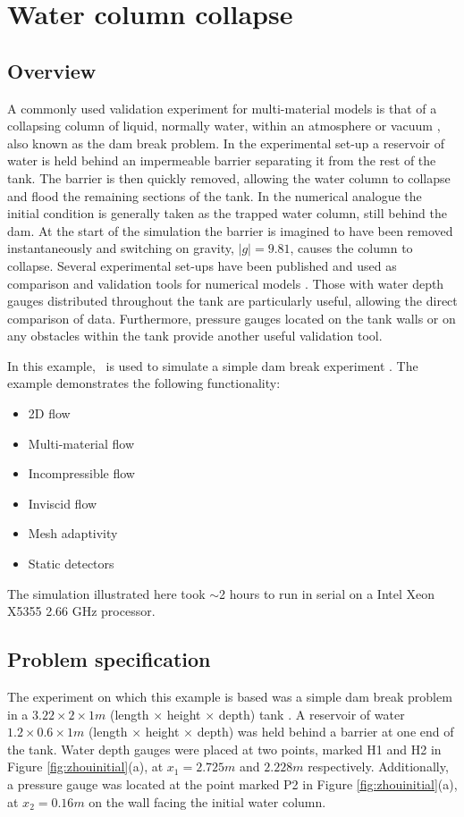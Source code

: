 \section{Water column collapse}
\label{sect:water_collapse}

\subsection{Overview}
A commonly used validation experiment for multi-material models is that of a collapsing column of liquid, normally water, within an atmosphere or vacuum \citep{lakehal_interface_2002}, also known as the dam break problem.  In the experimental set-up a reservoir of water is held behind an impermeable barrier separating it from the rest of the tank.  The barrier is then quickly removed, allowing the water column to collapse and flood the remaining sections of the tank.  In the numerical analogue the initial condition is generally taken as the trapped water column, still behind the dam.  At the start of the simulation the barrier is imagined to have been removed instantaneously and switching on gravity, $|g| = 9.81$, causes the column to collapse.   Several experimental set-ups have been published and used as comparison and validation tools for numerical models \citep{martin_part_1952, greaves_simulation_2006}.  Those with water depth gauges distributed throughout the tank are particularly useful, allowing the direct comparison of data.  Furthermore, pressure gauges located on the tank walls or on any obstacles within the tank provide another useful validation tool.

In this example, \fluidity\ is used to simulate a simple dam break experiment \citep{zhou_nonlinear_1999}.  The example demonstrates the following functionality:

\begin{itemize}
\item 2D flow
\item Multi-material flow
\item Incompressible flow
\item Inviscid flow
\item Mesh adaptivity
\item Static detectors
\end{itemize}

The simulation illustrated here took $\sim$2 hours to run in serial on a Intel Xeon X5355 2.66 GHz processor.

\subsection{Problem specification}
The experiment on which this example is based was a simple dam break problem in a $3.22\times2\times1m$ (length $\times$ height $\times$ depth) tank \citep{zhou_nonlinear_1999}.  A reservoir of water $1.2\times0.6\times1m$ (length $\times$ height $\times$ depth) was held behind a barrier at one end of the tank.  Water depth gauges were placed at two points, marked H1 and H2 in Figure \ref{fig:zhouinitial}(a), at $x_1 = 2.725m$ and $2.228m$ respectively.  Additionally, a pressure gauge was located at the point marked P2 in Figure \ref{fig:zhouinitial}(a), at $x_2=0.16m$ on the wall facing the initial water column.

